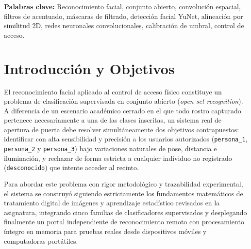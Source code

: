 \documentclass{article}
\begin{document}
\begin{abstract}
seleccionada como el clasificador activo en producción tanto en la interfaz local como en el portal independiente de reconocimiento remoto.
 Como extensión final se incorporan un diagnóstico cuantitativo que atribuye los fallos de \texttt{persona\_3} a la cobertura de condiciones de captura y no a sobreajuste clásico, un reentrenamiento con las sesiones de distancia, y un indicador físico de acceso con Arduino Uno que enciende un LED distinto por persona autorizada tanto en la interfaz local como en el portal remoto.
\end{abstract}

\textbf{Palabras clave:} Reconocimiento facial, conjunto abierto, convolución espacial, filtros de acentuado, máscaras de filtrado, detección facial YuNet, alineación por similitud 2D, redes neuronales convolucionales, calibración de umbral, control de acceso.

\newpage

\section{Introducción y Objetivos}

El reconocimiento facial aplicado al control de acceso físico constituye un problema de clasificación supervisada en conjunto abierto (\textit{open-set recognition}). A diferencia de un escenario académico cerrado en el que todo rostro capturado pertenece necesariamente a una de las clases inscritas, un sistema real de apertura de puerta debe resolver simultáneamente dos objetivos contrapuestos: identificar con alta sensibilidad y precisión a los usuarios autorizados (\texttt{persona\_1}, \texttt{persona\_2} y \texttt{persona\_3}) bajo variaciones naturales de pose, distancia e iluminación, y rechazar de forma estricta a cualquier individuo no registrado (\texttt{desconocido}) que intente acceder al recinto.

Para abordar este problema con rigor metodológico y trazabilidad experimental, el sistema se construyó siguiendo estrictamente los fundamentos matemáticos de tratamiento digital de imágenes y aprendizaje estadístico revisados en la asignatura, integrando cinco familias de clasificadores supervisados y desplegando finalmente un portal independiente de reconocimiento remoto con procesamiento íntegro en memoria para pruebas reales desde dispositivos móviles y computadoras portátiles.
\end{document}
